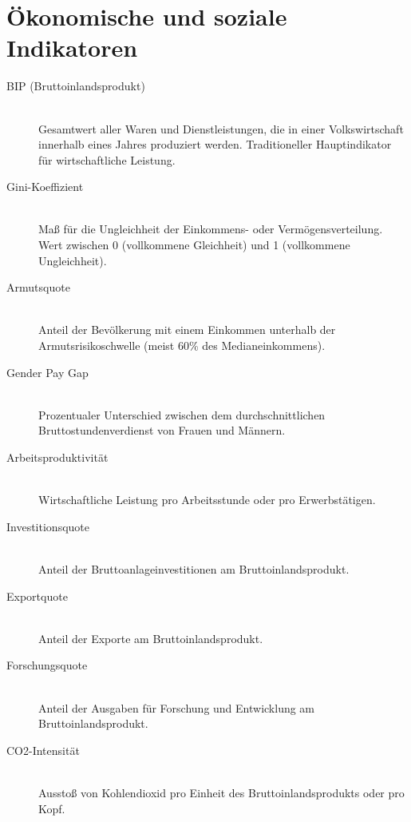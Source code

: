 \section{Ökonomische und soziale Indikatoren}

\begin{description}
    \item[BIP (Bruttoinlandsprodukt)] \hfill \\
    Gesamtwert aller Waren und Dienstleistungen, die in einer Volkswirtschaft innerhalb eines Jahres produziert werden. Traditioneller Hauptindikator für wirtschaftliche Leistung.
    
    \item[Gini-Koeffizient] \hfill \\
    Maß für die Ungleichheit der Einkommens- oder Vermögensverteilung. Wert zwischen 0 (vollkommene Gleichheit) und 1 (vollkommene Ungleichheit).
    
    \item[Armutsquote] \hfill \\
    Anteil der Bevölkerung mit einem Einkommen unterhalb der Armutsrisikoschwelle (meist 60\% des Medianeinkommens).
    
    \item[Gender Pay Gap] \hfill \\
    Prozentualer Unterschied zwischen dem durchschnittlichen Bruttostundenverdienst von Frauen und Männern.
    
    \item[Arbeitsproduktivität] \hfill \\
    Wirtschaftliche Leistung pro Arbeitsstunde oder pro Erwerbstätigen.
    
    \item[Investitionsquote] \hfill \\
    Anteil der Bruttoanlageinvestitionen am Bruttoinlandsprodukt.
    
    \item[Exportquote] \hfill \\
    Anteil der Exporte am Bruttoinlandsprodukt.
    
    \item[Forschungsquote] \hfill \\
    Anteil der Ausgaben für Forschung und Entwicklung am Bruttoinlandsprodukt.
    
    \item[CO2-Intensität] \hfill \\
    Ausstoß von Kohlendioxid pro Einheit des Bruttoinlandsprodukts oder pro Kopf.
\end{description}

